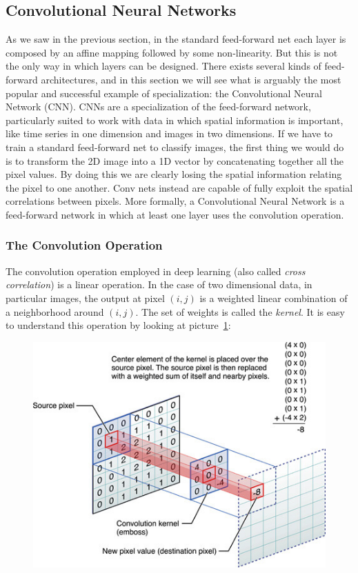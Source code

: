 \documentclass[../main.tex]{subfiles}
\begin{document}
    \subsection{Convolutional Neural Networks}\label{subsec:convnets}
    As we saw in the previous section, in the standard feed-forward net each layer is composed by an affine mapping followed by some non-linearity.
    But this is not the only way in which layers can be designed. There exists several kinds of feed-forward architectures, and in this section
    we will see what is arguably the most popular and successful example of specialization: the Convolutional Neural Network (CNN).
    \newline
    CNNs are a specialization of the feed-forward network, particularly suited to work with data in which spatial information is important, like
    time series in one dimension and images in two dimensions. If we have to train a standard feed-forward net to classify images, the first
    thing we would do is to transform the 2D image into a 1D vector by concatenating together all the pixel values. By doing this we are
    clearly losing the spatial information relating the pixel to one another. Conv nets instead are capable of fully exploit the spatial
    correlations between pixels.
    \newline
    More formally, a Convolutional Neural Network is a feed-forward network in which at least one layer uses the convolution operation.

    \subsubsection{The Convolution Operation}
    The convolution operation employed in deep learning (also called \textit{cross correlation}) is a linear operation.
    In the case of two dimensional data, in particular images, the output at pixel $(i, j)$ is a weighted linear combination
    of a neighborhood around $(i, j)$. The set of weights is called the \textit{kernel}. It is easy to understand this operation
    by looking at picture~\ref{fig:convolution-op}:

    \begin{figure}[h!]
        \centering
    	\includegraphics[width=.8\linewidth]{img/convolution-op.png}
        \label{fig:convolution-op}
	\end{figure}
\end{document}
